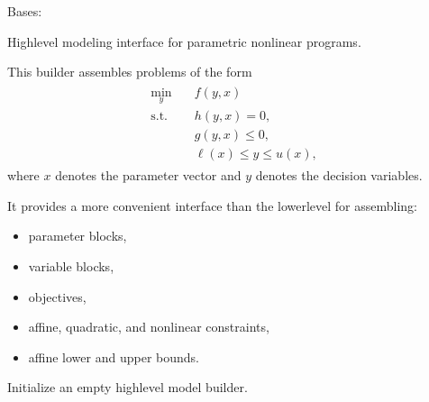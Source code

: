 \documentclass[letterpaper,10pt,english,openany,oneside]{sphinxmanual}
\begin{document}
\begin{fulllineitems}
\label{\detokenize{api/core/jaxmodel/highlevel:jaxmodel.highlevel.HighLevelNLPBuilder}}
\pysigstartsignatures
{}
\pysigstopsignatures
\sphinxAtStartPar
Bases: 

\sphinxAtStartPar
High\sphinxhyphen{}level modeling interface for parametric nonlinear programs.

\sphinxAtStartPar
This builder assembles problems of the form
\begin{equation*}
\begin{split}\begin{aligned}
    \min_y \quad & f(y, x) \\
    \text{s.t.}\quad & h(y, x) = 0, \\
    & g(y, x) \le 0, \\
    & \ell(x) \le y \le u(x),
\end{aligned}\end{split}
\end{equation*}
\sphinxAtStartPar
where \(x\) denotes the parameter vector and \(y\) denotes the
decision variables.

\sphinxAtStartPar
It provides a more convenient interface than the lower\sphinxhyphen{}level
{\hyperref[\detokenize{api/core/jaxmodel/builder:jaxmodel.builder.NLPBuilder}]{}} for assembling:
\begin{itemize}
\item {} 
\sphinxAtStartPar
parameter blocks,

\item {} 
\sphinxAtStartPar
variable blocks,

\item {} 
\sphinxAtStartPar
objectives,

\item {} 
\sphinxAtStartPar
affine, quadratic, and nonlinear constraints,

\item {} 
\sphinxAtStartPar
affine lower and upper bounds.

\end{itemize}

\sphinxAtStartPar
Initialize an empty high\sphinxhyphen{}level model builder.


\end{fulllineitems}
\end{document}

